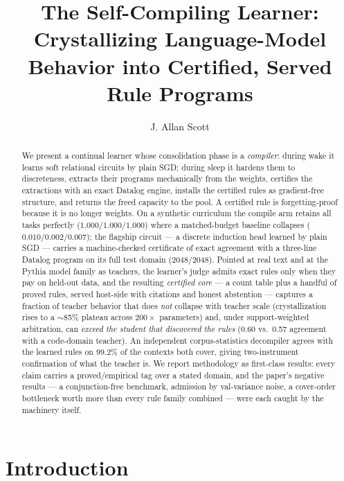 \documentclass[sigconf,nonacm]{acmart}
\begin{document}
\title{The Self-Compiling Learner: Crystallizing Language-Model Behavior into
Certified, Served Rule Programs}

\author{J. Allan Scott}
\affiliation{\institution{}\country{}}

\begin{abstract}
We present a continual learner whose consolidation phase is a \emph{compiler}: during wake it
learns soft relational circuits by plain SGD; during sleep it hardens them to discreteness,
extracts their programs mechanically from the weights, certifies the extractions with an exact
Datalog engine, installs the certified rules as gradient-free structure, and returns the freed
capacity to the pool. A certified rule is forgetting-proof because it is no longer weights. On a
synthetic curriculum the compile arm retains all tasks perfectly ($1.000/1.000/1.000$) where a
matched-budget baseline collapses ($0.010/0.002/0.007$); the flagship circuit --- a discrete
induction head learned by plain SGD --- carries a machine-checked certificate of exact agreement
with a three-line Datalog program on its full test domain (2048/2048). Pointed at real text and at
the Pythia model family as teachers, the learner's judge admits exact rules only when they pay on
held-out data, and the resulting \emph{certified core} --- a count table plus a handful of proved
rules, served host-side with citations and honest abstention --- captures a fraction of teacher
behavior that does \emph{not} collapse with teacher scale (crystallization rises to a
$\sim$85\% plateau across $200\times$ parameters) and, under support-weighted arbitration, can
\emph{exceed the student that discovered the rules} (0.60 vs.\ 0.57 agreement with a code-domain
teacher). An independent corpus-statistics decompiler agrees with the learned rules on 99.2\% of
the contexts both cover, giving two-instrument confirmation of what the teacher is. We report
methodology as first-class results: every claim carries a proved/empirical tag over a stated
domain, and the paper's negative results --- a conjunction-free benchmark, admission by
val-variance noise, a cover-order bottleneck worth more than every rule family combined --- were
each caught by the machinery itself.
\end{abstract}

\maketitle

\section{Introduction}
\end{document}
